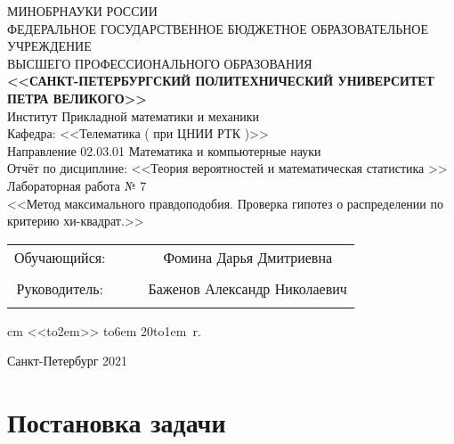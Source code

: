 \documentclass[12pt]{article}
\begin{document}
\begin{center}
\hfill \break
\large{МИНОБРНАУКИ РОССИИ} \\
\hfill \break
\small {ФЕДЕРАЛЬНОЕ ГОСУДАРСТВЕННОЕ БЮДЖЕТНОЕ ОБРАЗОВАТЕЛЬНОЕ УЧРЕЖДЕНИЕ }\\
\small { ВЫСШЕГО ПРОФЕССИОНАЛЬНОГО ОБРАЗОВАНИЯ  } \\
\hfill \break
\normalsize {\textbf{ <<САНКТ-ПЕТЕРБУРГСКИЙ ПОЛИТЕХНИЧЕСКИЙ УНИВЕРСИТЕТ } }\\
{\normalsize {\textbf { ПЕТРА ВЕЛИКОГО>>}}} \\
\hfill \break
\large{Институт Прикладной математики и механики }\\
\hfill \break
\large{ Кафедра: <<Телематика ( при ЦНИИ РТК )>> }\\
\hfill \break
Направление 02.03.01 Математика и компьютерные науки\\
\vskip 1cm
\Large {Отчёт по дисциплине:}
\vskip 0.2cm
\Large{<<Теория вероятностей и математическая статистика >>} \\
\hfill \break
\large{Лабораторная работа № 7} \\
\hfill \break
\large{<<Метод максимального правдоподобия. Проверка гипотез о распределении по критерию хи-квадрат.>>} \\
\hfill \break
\vskip 0.3cm
\vskip 0.5cm
\end{center}


\begin {tabular}{cccc}
\hspace{0.5cm}Обучающийся: &\underline {\hspace{3cm}} &  &Фомина Дарья Дмитриевна \\\\
\hspace{0.5cm}Руководитель: &\underline {\hspace{3cm}} & &Баженов Александр Николаевич\\\\
\end{tabular}
 cm
\hspace{9cm}\def \hrf#1{\hbox to#1{\hrulefill}}<<\hrf{2em}>>  \hrf{6em}  20\hrf{1em}~r.
\vskip 1.5cm
\begin {center} Санкт-Петербург 2021 \end{center}

\thispagestyle{empty}

\newpage


\tableofcontents


\newpage
\section{Постановка задачи}
\end{document}

